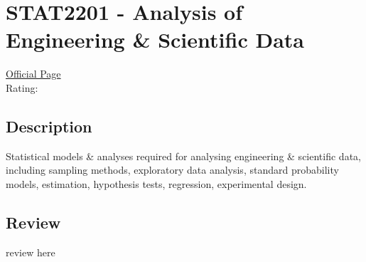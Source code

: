 \hypertarget{STAT2201}{\section{STAT2201 - Analysis of Engineering \& Scientific Data}}

\large
\textcolor{turbo_purple}{\href{https://my.uq.edu.au/programs-courses/course.html?course_code=STAT2201}{Official Page}} \\
Rating: \cstar\cstar\cstar\cstar\ostar

\normalsize
\subsection*{Description}
Statistical models \& analyses required for analysing engineering \& scientific data, including sampling methods, exploratory data analysis, standard probability models, estimation, hypothesis tests, regression, experimental design.

\subsection*{Review}
review here
